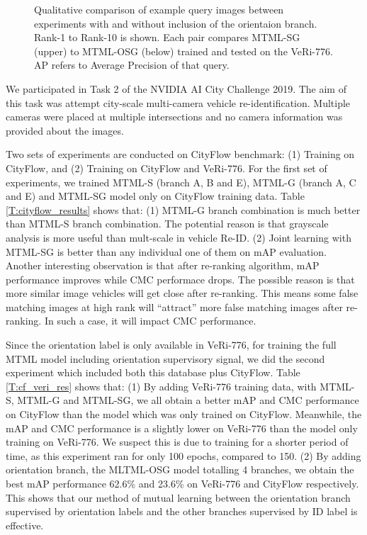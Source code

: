 \documentclass[10pt,twocolumn,letterpaper]{article}
\begin{document}
\begin{figure}[ht]
    \caption{
        Qualitative comparison of example query images between experiments with
        and without inclusion of the orientaion branch.
        Rank-1 to Rank-10 is shown. Each pair compares MTML-SG
        (upper) to MTML-OSG (below) trained and tested on the VeRi-776.
        AP refers to Average Precision of that query.
    }
    \label{fig:ranks}
\end{figure}

We participated in Task 2 of the NVIDIA AI City Challenge 2019. The aim of this
task was attempt city-scale multi-camera vehicle re-identification. Multiple
cameras were placed at multiple intersections and no camera information was
provided about the images.

Two sets of experiments are conducted on CityFlow benchmark:
(1) Training on CityFlow, and (2) Training on CityFlow and VeRi-776.
%
For the first set of experiments, we trained MTML-S (branch A, B and E),
MTML-G (branch A, C and E) and MTML-SG model only on CityFlow training data.
Table \ref{T:cityflow_results} shows that:
(1) MTML-G branch combination is much better than MTML-S branch combination.
The potential reason is that grayscale analysis is more useful than mult-scale in vehicle Re-ID.
(2) Joint learning with MTML-SG is better than any individual one of them on mAP evaluation.
Another interesting observation is that
after re-ranking algorithm, mAP performance improves while CMC performace drops.
The possible reason is that more similar image vehicles will get close after re-ranking.
This means some false matching images at high rank will ``attract'' more false matching images after re-ranking.
In such a case, it will impact CMC performance.

Since the orientation label is only available in VeRi-776,
for training the full MTML model including orientation supervisory signal,
we did the second experiment which included both this database plus CityFlow.
%
Table \ref{T:cf_veri_res} shows that:
(1) By adding VeRi-776 training data,
with MTML-S, MTML-G and MTML-SG,
we all obtain a better mAP and CMC performance on CityFlow
than the model which was only trained on CityFlow.
Meanwhile, the mAP and CMC performance is a slightly lower on VeRi-776
than the model only training on VeRi-776. We suspect this is due to training
for a shorter period of time, as this experiment ran for only 100 epochs, compared to 150.
(2) By adding orientation branch, the MLTML-OSG model totalling 4 branches,
we obtain the best mAP performance {62.6\%} and {23.6\%} on VeRi-776 and
CityFlow respectively.
This shows that our method of mutual learning between the orientation branch supervised by orientation labels and the other branches supervised by ID label is effective.
\end{document}
